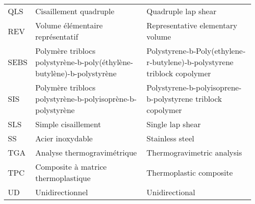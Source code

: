 \begin{longtable}{p{0.75in}>{\raggedright\arraybackslash}p{2.5in} p{2.5in}}
	QLS   & Cisaillement quadruple                                                & Quadruple lap shear                                                      \\
	REV   & Volume élémentaire représentatif                                      & Representative elementary volume                                         \\
	SEBS  & Polymère triblocs polystyrène-b-poly(éthylène-butylène)-b-polystyrène & Polystyrene‐b‐Poly(ethylene‐r‐butylene)‐b‐polystyrene triblock copolymer \\
	SIS   & Polymère triblocs polystyrène-b-polyisoprène-b-polystyrène            & Polystyrene-b-polyisoprene-b-polystyrene triblock copolymer              \\
	SLS   & Simple cisaillement                                                   & Single lap shear                                                         \\
	SS    & Acier inoxydable                                                      & Stainless steel                                                          \\
	TGA   & Analyse thermogravimétrique                                           & Thermogravimetric analysis                                               \\
	TPC   & Composite à matrice thermoplastique                                   & Thermoplastic composite                                                  \\
	UD    & Unidirectionnel                                                       & Unidirectional
\end{longtable}